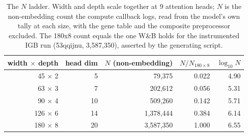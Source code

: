 
\begin{table}[htbp]
\centering\footnotesize
\caption{The $N$ ladder. Width and depth scale together at 9 attention heads; $N$ is the non-embedding count the compute callback logs, read from the model's own tally at each size, with the gene table and the composite preprocessor excluded. The 180x8 count equals the one W\&B holds for the instrumented IGB run (53qqijnu, 3,587,350), asserted by the generating script.}
\label{tab:sizes}
\begin{tabular}{rrrrr}
\toprule
width $\times$ depth & head dim & $N$ (non-embedding) & $N / N_{180\times 8}$ & $\log_{10} N$ \\
\midrule
45 $\times$ 2 & 5 & 79,375 & 0.022 & 4.90 \\
63 $\times$ 3 & 7 & 202,612 & 0.056 & 5.31 \\
90 $\times$ 4 & 10 & 509,260 & 0.142 & 5.71 \\
126 $\times$ 6 & 14 & 1,378,444 & 0.384 & 6.14 \\
180 $\times$ 8 & 20 & 3,587,350 & 1.000 & 6.55 \\
\bottomrule
\end{tabular}
\end{table}
